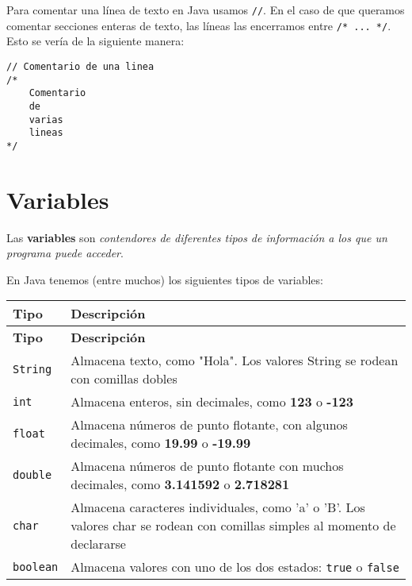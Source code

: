 \documentclass[12pt]{article}
\theoremstyle{largebreak}
\begin{document}
    Para comentar una línea de texto en Java usamos \lstinline|//|. En el caso de que queramos comentar secciones enteras de texto, las líneas las encerramos entre \lstinline|/* ... */|. Esto se vería de la siguiente manera:

    \begin{lstlisting}[caption={Comentarios.},label=DescriptiveLabel]
// Comentario de una linea
/*
    Comentario
    de
    varias
    lineas
*/
    \end{lstlisting}

    \section{Variables}

    \begin{mydef}
        Las \textbf{variables} son \textit{contendores de diferentes tipos de información a los que un programa puede acceder}.
    \end{mydef}

    En Java tenemos (entre muchos) los siguientes tipos de variables:

    \begin{longtable}{l p{}}
    \toprule
    \textbf{Tipo} & \textbf{Descripción} \\
    \midrule
    \endfirsthead

    \midrule
    \textbf{Tipo} & \textbf{Descripción} \\
    \midrule
    \endhead

    \bottomrule
    \endfoot

    \lstinline|String| & Almacena texto, como "Hola". Los valores String se rodean con comillas dobles \\
    \lstinline|int| & Almacena enteros, sin decimales, como \textbf{123} o \textbf{-123} \\
    \lstinline|float| & Almacena números de punto flotante, con algunos decimales, como \textbf{19.99} o \textbf{-19.99} \\
    \lstinline|double| & Almacena números de punto flotante con muchos decimales, como \textbf{3.141592} o \textbf{2.718281} \\
    \lstinline|char| & Almacena caracteres individuales, como 'a' o 'B'. Los valores char se rodean con comillas simples al momento de declararse \\
    \lstinline|bool|\lstinline|ean| & Almacena valores con uno de los dos estados: \lstinline|true| o \lstinline|false| \\
    \end{longtable}
\end{document}
